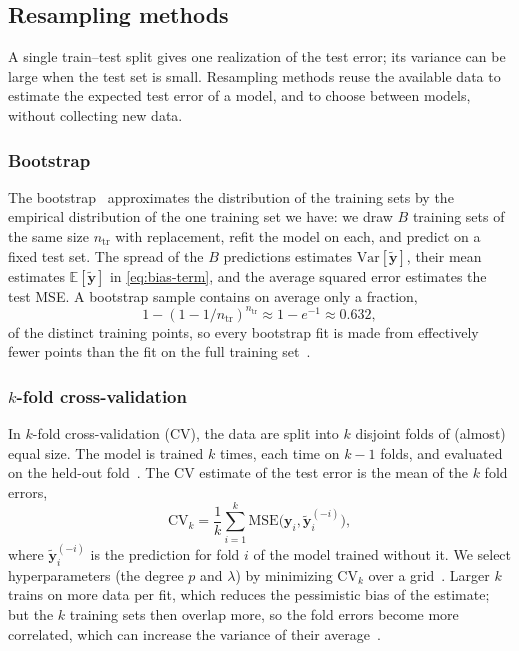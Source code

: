 \subsection{Resampling methods}
\label{subsec:resampling}

A single train--test split gives one realization of the test error; its
variance can be large when the test set is small. Resampling methods reuse the
available data to estimate the expected test error of a model, and to choose
between models, without collecting new data.

\subsubsection{Bootstrap}
The bootstrap~\cite{efron_1979} approximates the
distribution of the training sets by the empirical distribution of the one
training set we have: we draw $B$ training sets of the same size $n_\text{tr}$
with replacement, refit the model on each, and predict on a fixed test set. The
spread of the $B$ predictions estimates $\mathrm{Var}[\tilde{\bm{y}}]$, their
mean estimates $\mathbb{E}[\tilde{\bm{y}}]$ in \cref{eq:bias-term}, and the
average squared error estimates the test MSE. A bootstrap sample contains on
average only a fraction,
\begin{equation}\label{eq:bootstrap-size}
    1-(1-1/n_\text{tr})^{n_\text{tr}} \approx 1 - e^{-1} \approx 0.632,
\end{equation}
of the distinct training points, so every bootstrap fit is made
from effectively fewer points than the fit on the full training
set~\cite{hastie_2017}.

\subsubsection{\texorpdfstring{$k$}{k}-fold cross-validation}
In $k$-fold cross-validation (CV), the data are split into $k$ disjoint folds of
(almost) equal size. The model is trained $k$ times, each time on $k-1$ folds,
and evaluated on the held-out fold~\cite{geron_2023}. The
CV estimate of the test error is the mean of the $k$ fold errors,
\begin{equation}\label{eq:cv}
    \mathrm{CV}_k = \frac{1}{k}\sum_{i=1}^{k}\mathrm{MSE}\big(
    \bm{y}_{i}, \tilde{\bm{y}}_{i}^{(-i)}\big),
\end{equation}
where $\tilde{\bm{y}}_{i}^{(-i)}$ is the prediction for fold $i$ of the
model trained without it. We select hyperparameters (the degree $p$ and
$\lambda$) by minimizing $\mathrm{CV}_k$ over a
grid~\cite{hjorth-jensen_2026}. Larger $k$ trains on
more data per fit, which reduces the pessimistic bias of the
estimate; but the $k$ training sets then overlap more, so the fold errors
become more correlated, which can increase the variance of their
average~\cite{hastie_2017}.


